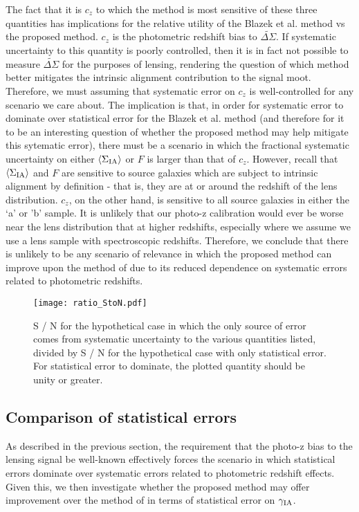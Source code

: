 \documentclass[a4paper,fleqn,usenatbib,useAMS]{mnras}
\begin{document}
The fact that it is $c_z$ to which the method is most sensitive of these three quantities has implications for the relative utility of the Blazek et al. method vs the proposed method. $c_z$ is the photometric redshift bias to $\tilde{\Delta \Sigma}$. If systematic uncertainty to this quantity is poorly controlled, then it is in fact not possible to measure $\tilde{\Delta \Sigma}$ for the purposes of lensing, rendering the question of which method better mitigates the intrinsic alignment contribution to the signal moot. Therefore, we must assuming that systematic error on $c_z$ is well-controlled for any scenario we care about. The implication is that, in order for systematic error to dominate over statistical error for the Blazek et al. method (and therefore for it to be an interesting question of whether the proposed method may help mitigate this sytematic error), there must be a scenario in which the fractional systematic uncertainty on either $\langle \Sigma_{\rm IA} \rangle$ or $F$ is larger than that of $c_z$. However, recall that $\langle \Sigma_{\rm IA} \rangle$ and $F$ are sensitive to source galaxies which are subject to intrinsic alignment by definition - that is, they are at or around the redshift of the lens distribution. $c_z$, on the other hand, is sensitive to all source galaxies in either the `a' or 'b' sample. It is unlikely that our photo-z calibration would ever be worse near the lens distribution that at higher redshifts, especially where we assume we use a lens sample with spectroscopic redshifts. Therefore, we conclude that there is unlikely to be any scenario of relevance in which the proposed method can improve upon the method of \cite{Blazek2012} due to its reduced dependence on systematic errors related to photometric redshifts.

\begin{figure*}
\centering
\texttt{[image: ratio\_StoN.pdf]}
\caption{S / N for the hypothetical case in which the only source of error comes from systematic uncertainty to the various quantities listed, divided by S / N for the hypothetical case with only statistical error. For statistical error to dominate, the plotted quantity should be unity or greater.}
\label{fig:StoNsysvstat}
\end{figure*}
\subsection{Comparison of statistical errors}
\label{subsec:statresults}
\noindent
As described in the previous section, the requirement that the photo-z bias to the lensing signal be well-known effectively forces the scenario in which statistical errors dominate over systematic errors related to photometric redshift effects. Given this, we then investigate whether the proposed method may offer improvement over the method of \cite{Blazek2012} in terms of statistical error on $\gamma_{\rm IA}$. 
\end{document}
